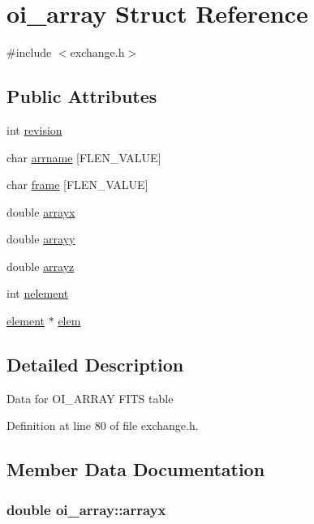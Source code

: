 \hypertarget{structoi__array}{
\section{oi\_\-array Struct Reference}
\label{structoi__array}
}


{\ttfamily \#include $<$exchange.h$>$}

\subsection*{Public Attributes}
\begin{DoxyCompactItemize}
\item 
int \hyperlink{structoi__array_ac04d3a51227d87b0ce8ed00998707265}{revision}
\item 
char \hyperlink{structoi__array_a24769651d50705d2f326eb617eb8a7b9}{arrname} \mbox{[}FLEN\_\-VALUE\mbox{]}
\item 
char \hyperlink{structoi__array_a0b2f629dcd69627a83d2dd9a27ff7ba7}{frame} \mbox{[}FLEN\_\-VALUE\mbox{]}
\item 
double \hyperlink{structoi__array_ac04a465a1cd58f9e8479c3bbe9a9fca4}{arrayx}
\item 
double \hyperlink{structoi__array_aaff338ace9d96e21b5f8c6849bd18eb6}{arrayy}
\item 
double \hyperlink{structoi__array_aa283e8605364147a8a2be34acf58a551}{arrayz}
\item 
int \hyperlink{structoi__array_a91e7d5e5eea710bf4c47eb891783d383}{nelement}
\item 
\hyperlink{structelement}{element} $\ast$ \hyperlink{structoi__array_a879ae8d7bd9bb6156639d067f7c039fa}{elem}
\end{DoxyCompactItemize}


\subsection{Detailed Description}
Data for OI\_\-ARRAY FITS table 

Definition at line 80 of file exchange.h.



\subsection{Member Data Documentation}
\hypertarget{structoi__array_ac04a465a1cd58f9e8479c3bbe9a9fca4}{
\subsubsection[{arrayx}]{\setlength{\rightskip}{0pt plus 5cm}double {\bf oi\_\-array::arrayx}}}
\label{structoi__array_ac04a465a1cd58f9e8479c3bbe9a9fca4}


